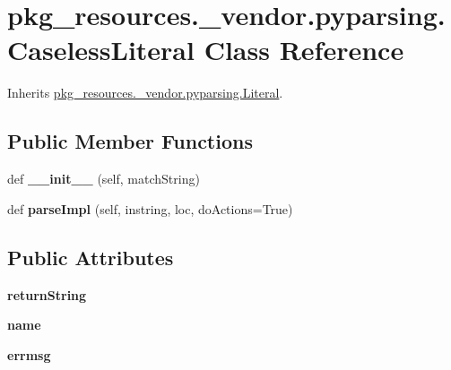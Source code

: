\hypertarget{classpkg__resources_1_1__vendor_1_1pyparsing_1_1_caseless_literal}{}\section{pkg\+\_\+resources.\+\_\+vendor.\+pyparsing.\+Caseless\+Literal Class Reference}
\label{classpkg__resources_1_1__vendor_1_1pyparsing_1_1_caseless_literal}


Inherits \hyperlink{classpkg__resources_1_1__vendor_1_1pyparsing_1_1_literal}{pkg\+\_\+resources.\+\_\+vendor.\+pyparsing.\+Literal}.

\subsection*{Public Member Functions}
\begin{DoxyCompactItemize}
\item 
\mbox{\label{classpkg__resources_1_1__vendor_1_1pyparsing_1_1_caseless_literal_a069f18375b91ce9c1e2aa530f02c3bfc}} 
def {\bfseries \+\_\+\+\_\+init\+\_\+\+\_\+} (self, match\+String)
\item 
\mbox{\label{classpkg__resources_1_1__vendor_1_1pyparsing_1_1_caseless_literal_aed18b36a50ecbdb395c5699bd4a9bb69}} 
def {\bfseries parse\+Impl} (self, instring, loc, do\+Actions=True)
\end{DoxyCompactItemize}
\subsection*{Public Attributes}
\begin{DoxyCompactItemize}
\item 
\mbox{\label{classpkg__resources_1_1__vendor_1_1pyparsing_1_1_caseless_literal_a9248e42c15b35a51bc72e7d57c83395c}} 
{\bfseries return\+String}
\item 
\mbox{\label{classpkg__resources_1_1__vendor_1_1pyparsing_1_1_caseless_literal_ab6a2d21f56b3ce6ebc866b612b395fec}} 
{\bfseries name}
\item 
\mbox{\label{classpkg__resources_1_1__vendor_1_1pyparsing_1_1_caseless_literal_a2e0948e33687920a316e8203225d3c40}} 
{\bfseries errmsg}
\end{DoxyCompactItemize}
